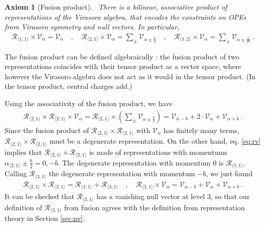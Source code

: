 \documentclass[12pt, a4paper]{article}
\theoremstyle{break}
\newtheorem{hyp}[exo]{Axiom}
\begin{document}
\begin{hyp}[Fusion product]
 ~\label{hyp:fus}
 There is a bilinear, associative product of representations of the Virasoro algebra, that encodes the constraints on OPEs from Virasoro symmetry and null vectors. In particular,
 \begin{align}
  \mathcal{R}_{\langle 1,1\rangle}\times \mathcal V_\alpha = \mathcal V_\alpha \quad , \quad 
  \mathcal{R}_{\langle 2,1\rangle}\times \mathcal V_\alpha = \sum_\pm \mathcal V_{\alpha\pm \frac{b}{2}}\quad , \quad  
  \mathcal{R}_{\langle 1,2\rangle}\times \mathcal V_\alpha = \sum_\pm \mathcal V_{\alpha\pm \frac{1}{2b}}\ .
  \label{eq:rv}
 \end{align}
\end{hyp}
The fusion product can be defined algebraically \cite{gab99}: the fusion product of two representations coincides with their tensor product as a vector space, where however the Virasoro algebra does not act as it would in the tensor product. (In the tensor product, central charges add.) 

Using the associativity of the fusion product, we have 
\begin{align}
 \mathcal{R}_{\langle 2,1\rangle}\times \mathcal{R}_{\langle 2,1\rangle}  \times \mathcal V_\alpha  =
\mathcal{R}_{\langle 2,1\rangle}\times  \left(\sum_\pm \mathcal V_{\alpha\pm \frac{b}{2}}\right) =
\mathcal V_{\alpha - b} + 2\cdot \mathcal V_\alpha + \mathcal V_{\alpha + b} \ .
\end{align}
Since the fusion product of $\mathcal{R}_{\langle 2,1\rangle}\times \mathcal{R}_{\langle 2,1\rangle} $ with $\mathcal V_\alpha$ has finitely many terms, $\mathcal{R}_{\langle 2,1\rangle}\times \mathcal{R}_{\langle 2,1\rangle} $
must be a degenerate representation. 
On the other hand, eq. \eqref{eq:rv} implies that $\mathcal{R}_{\langle 2,1\rangle}\times \mathcal{R}_{\langle 2,1\rangle} $ is made of representations with momentums $\alpha_{\langle 2,1\rangle} \pm \frac{b}{2} = 0,-b$. The degenerate representation with momentum $0$ is $\mathcal{R}_{\langle 1,1\rangle}$. Calling $\mathcal{R}_{\langle 3,1\rangle}$ the degenerate representation with momentum $-b$, we just found
\begin{align}
 \mathcal{R}_{\langle 2,1\rangle}\times \mathcal{R}_{\langle 2,1\rangle} = \mathcal{R}_{\langle 1,1\rangle} + \mathcal{R}_{\langle 3,1\rangle} \quad , \quad \mathcal{R}_{\langle 3,1\rangle} \times \mathcal V_\alpha = \mathcal V_{\alpha - b} + \mathcal V_\alpha + \mathcal V_{\alpha + b}\ .
\end{align}
It can be checked that $\mathcal{R}_{\langle 3,1\rangle}$ has a vanishing null vector at level $3$, so that our definition of $\mathcal{R}_{\langle 3,1\rangle}$ from fusion agrees with the definition from representation theory in Section \ref{sec:nv}.
\end{document}
